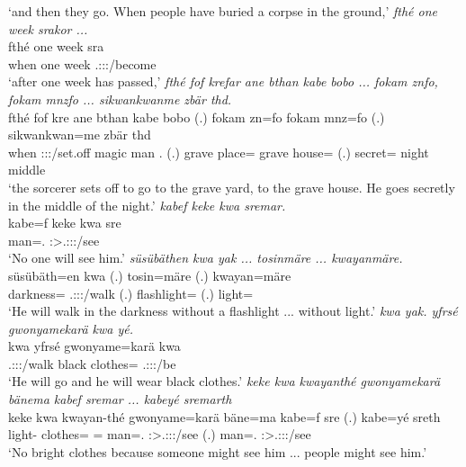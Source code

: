 \begin{exe}
	\trans `and then they go. When people have buried a corpse in the ground,'
	\emph{fthé one week srakor ...}\\
	\gll fthé one week sra\\
	when one week \Tsg.\Masc:\Sbj:\Irr:\Pfv/become\\
	\trans `after one week has passed,'
	\emph{fthé fof krefar ane bthan kabe bobo ... fokam znfo, fokam mnzfo ... sikwankwanme zbär thd.}\\
	\gll fthé fof kre ane bthan kabe bobo (.) fokam zn=fo fokam mnz=fo (.) sikwankwan=me zbär thd\\
	when {\Emph} \Stsg:\Sbj:\Irr:\Pfv/set.off {\Dem} magic man \Med.{\All} (.) grave place={\Loc} grave house={\Loc} (.) secret={\Ins} night middle\\
	\trans `the sorcerer sets off to go to the grave yard, to the grave house. He goes secretly in the middle of the night.'
	\emph{kabef keke kwa sremar.}\\
	\gll kabe=f keke kwa sre\\
	man=\Erg.{\Sg} {\Neg} {\Fut} \Stsg:\Sbj>\Tsg.\Masc:\Obj:\Irr:\Pfv/see\\
	\trans `No one will see him.'
	\emph{süsübäthen kwa yak ... tosinmäre ... kwayanmäre.}\\
	\gll süsübäth=en kwa  (.) tosin=märe (.) kwayan=märe\\
	darkness={\Loc} {\Fut} \Tsg.\Masc:\Sbj:\Nonpast:\Ipfv/walk (.) flashlight={\Priv} (.) light=\Priv\\
	\trans `He will walk in the darkness without a flashlight ... without light.'
	\emph{kwa yak. yfrsé gwonyamekarä kwa yé.}\\
	\gll kwa  yfrsé gwonyame=karä kwa \\
	{\Fut} \Tsg.\Masc:\Sbj:\Nonpast:\Ipfv/walk black clothes={\Prop} {\Fut} \Tsg.\Masc:\Sbj:\Nonpast:\Ipfv/be\\
	\trans `He will go and he will wear black clothes.'
	\emph{keke kwa kwayanthé gwonyamekarä bänema kabef sremar ... kabeyé sremarth}\\
	\gll keke kwa kwayan-thé gwonyame=karä bäne=ma kabe=f sre (.) kabe=yé sreth\\
	{\Neg} {\Fut} light-{\Adlzr} clothes={\Prop} \Recog={\Char} man=\Erg.{\Sg} \Stsg:\Sbj>\Tsg.\Masc:\Obj:\Irr:\Pfv/see (.) man=\Erg.{\Nsg} \Stpl:\Sbj>\Tsg.\Masc:\Obj:\Irr:\Pfv/see\\
	\trans `No bright clothes because someone might see him ... people might see him.'

\end{exe}

